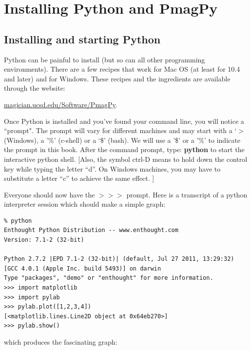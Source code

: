 \documentclass[11pt]{book}
\begin{document}
\section{Installing Python and PmagPy}
\label{sect:python}

\subsection{Installing and starting Python}


Python can  be painful to install (but so can  all other programming environments).  There are  a few recipes that work for Mac OS (at least for 10.4 and later) and for Windows.  These recipes and the ingredients are available through the website: 

\url{magician.ucsd.edu/Software/PmagPy}.



Once Python is installed and you've found your command line, you will notice a ``prompt".  
The prompt will vary for different machines and may start with a `$>$ (Windows), a '\%' (c-shell) or a `\$' (bash).  We will use a '\$'  or  a '\%' to indicate the prompt in this book.     After the command prompt, type:  {\bf python} to start the interactive python shell.  [Also, the symbol ctrl-D  means to hold down the control key while typing the letter ``d''.  On Windows machines, you may have to substitute a letter ``c'' to achieve the same effect. ]

 Everyone should now have the $>>>$ prompt.  Here is a transcript of a python interpreter session which should make a simple graph:  
 
 \begin{verbatim}
% python
Enthought Python Distribution -- www.enthought.com
Version: 7.1-2 (32-bit)

Python 2.7.2 |EPD 7.1-2 (32-bit)| (default, Jul 27 2011, 13:29:32) 
[GCC 4.0.1 (Apple Inc. build 5493)] on darwin
Type "packages", "demo" or "enthought" for more information.
>>> import matplotlib
>>> import pylab
>>> pylab.plot([1,2,3,4])
[<matplotlib.lines.Line2D object at 0x64eb270>]
>>> pylab.show()

\end{verbatim}

which produces the fascinating graph:
\end{document}
